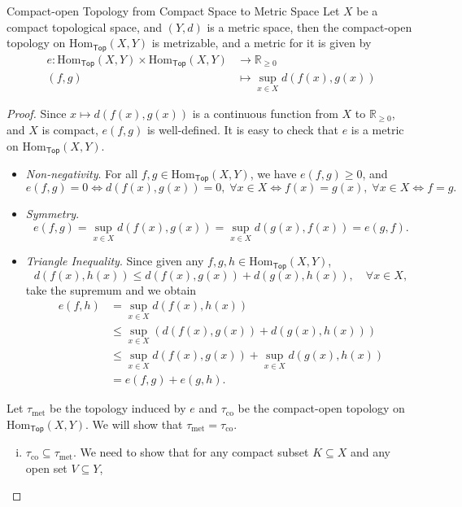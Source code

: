 \documentclass{report}
\begin{document}
\begin{proposition}{Compact-open Topology from Compact Space to Metric Space}{}
	Let $X$ be a compact topological space, and $(Y,d)$ is a metric space, then the compact-open topology on $\mathrm{Hom}_{\mathsf{Top}}(X,Y)$ is metrizable, and a metric for it is given by
	\begin{align*}
		e: \mathrm{Hom}_{\mathsf{Top}}(X,Y)\times \mathrm{Hom}_{\mathsf{Top}}(X,Y) &\longrightarrow \mathbb{R}_{\ge 0} \\
		(f,g) &\longmapsto \sup_{x \in X} d\left(f(x),g(x)\right)
	\end{align*}
\end{proposition}
\begin{proof}
	Since $x\mapsto d(f(x),g(x))$ is a continuous function from $X$ to $\mathbb{R}_{\ge 0}$, and $X$ is compact, $e(f,g)$ is well-defined. It is easy to check that $e$ is a metric on $\mathrm{Hom}_{\mathsf{Top}}(X,Y)$.
	\begin{itemize}
		\item \emph{Non-negativity}. For all $f,g\in \mathrm{Hom}_{\mathsf{Top}}(X,Y)$, we have $e(f,g) \ge 0$, and 
		\[
		e(f,g)=0 \iff  d\left(f(x),g(x)\right)=0,\; \forall x \in X\iff f(x)=g(x),\; \forall x \in X\iff f=g.
		\]
		\item \emph{Symmetry}.
		\[
		e(f,g)=\sup_{x\in X}d\left(f(x),g(x)\right)=\sup_{x\in X}d\left(g(x),f(x)\right)=e(g,f).
		\]
		\item \emph{Triangle Inequality}. Since given any $f,g,h\in \mathrm{Hom}_{\mathsf{Top}}(X,Y)$, 
		\[
		 d(f(x),h(x))\le d(f(x),g(x))+d(g(x),h(x)), \quad \forall x \in X,
		\]
		take the supremum and we obtain
		\begin{align*}
			e(f,h)&=\sup_{x\in X}d\left(f(x),h(x)\right)\\
			&\le \sup_{x\in X}\left(d\left(f(x),g(x)\right)+d\left(g(x),h(x)\right)\right)\\
			&\le \sup_{x\in X}d\left(f(x),g(x)\right)+ \sup_{x\in X}d\left(g(x),h(x)\right)\\
			&= e(f,g)+e(g,h).
		\end{align*}
	\end{itemize}
	Let $\tau_{\mathrm{met}}$ be the topology induced by $e$ and $\tau_{\mathrm{co}}$ be the compact-open topology on $\mathrm{Hom}_{\mathsf{Top}}(X,Y)$. We will show that $\tau_{\mathrm{met}}=\tau_{\mathrm{co}}$.
	\begin{enumerate}[(i)]
		\item $\tau_{\mathrm{co}}\subseteq \tau_{\mathrm{met}}$. We need to show that for any compact subset $K\subseteq X$ and any open set $V\subseteq Y$, 

\end{enumerate}
\end{proof}
\end{document}
